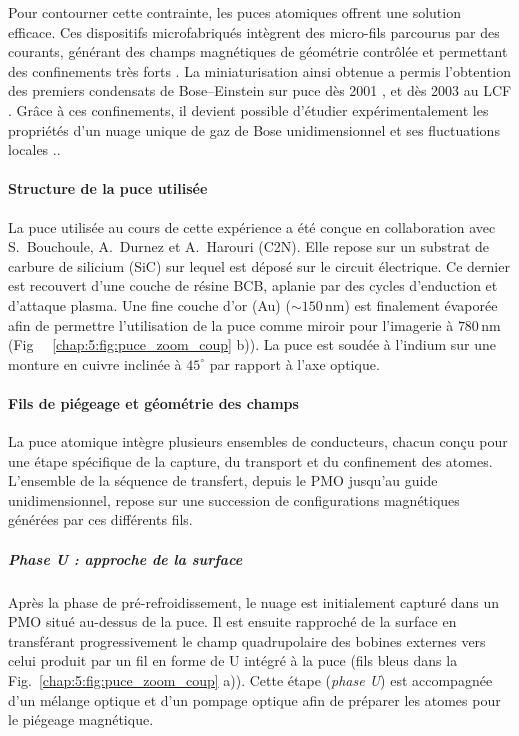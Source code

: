 Pour contourner cette contrainte, les puces atomiques offrent une solution efficace. Ces dispositifs microfabriqués intègrent des micro-fils parcourus par des courants, générant des champs magnétiques de géométrie contrôlée et permettant des confinements très forts \cite{Denschlag1999,Fortagh1998,Folman2000,Reichel1999}. La miniaturisation ainsi obtenue a permis l’obtention des premiers condensats de Bose–Einstein sur puce dès 2001 \cite{Haensel2001,Ott2001}, et dès 2003 au \gls{LCF} \cite{Aussibal2003}. Grâce à ces confinements, il devient possible d’étudier expérimentalement les propriétés d’un nuage unique de gaz de Bose unidimensionnel et ses fluctuations locales \cite{Schumm2005,Trebbia2006}..


\paragraph{Structure de la puce utilisée}
La puce utilisée au cours de cette expérience a été conçue en collaboration avec S.~Bouchoule, A.~Durnez et A.~Harouri (\gls{C2N}). Elle repose sur un substrat de carbure de silicium (\gls{SiC}) sur lequel est déposé sur le circuit électrique. Ce dernier est recouvert d’une couche de résine \gls{BCB}, aplanie par des cycles d’enduction et d’attaque plasma. Une fine couche d’or (\gls{Au}) (\(\sim 150\,\mathrm{nm}\)) est finalement évaporée afin de permettre l’utilisation de la puce comme miroir pour l’imagerie à \(780\,\mathrm{nm}\) (Fig ~ \ref{chap:5:fig:puce_zoom_coup} b)). La puce est soudée à l’indium sur une monture en cuivre inclinée à \(45^\circ\) par rapport à l’axe optique.


\paragraph{Fils de piégeage et géométrie des champs}
La puce atomique intègre plusieurs ensembles de conducteurs, chacun conçu pour une étape spécifique de la capture, du transport et du confinement des atomes. L’ensemble de la séquence de transfert, depuis le \gls{PMO} jusqu’au guide unidimensionnel, repose sur une succession de configurations magnétiques générées par ces différents fils.


\subparagraph{Phase U : approche de la surface}
Après la phase de pré-refroidissement, le nuage est initialement capturé dans un \gls{PMO} situé au-dessus de la puce. Il est ensuite rapproché de la surface en transférant progressivement le champ quadrupolaire des bobines externes vers celui produit par un fil en forme de U intégré à la puce (fils bleus dans la Fig.~\ref{chap:5:fig:puce_zoom_coup} a)). Cette étape (\textit{phase U}) est accompagnée d’un mélange optique et d’un pompage optique afin de préparer les atomes pour le piégeage magnétique.


